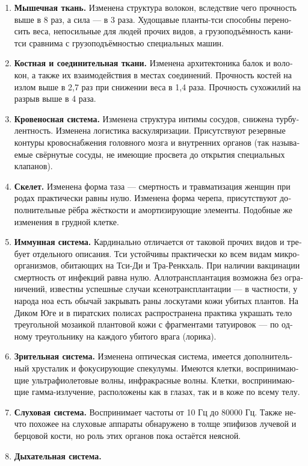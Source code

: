 \documentclass[a4paper,12pt,fleqn]{book}\usepackage{cooltooltips}\usepackage{polyglossia}\setdefaultlanguage[babelshorthands=true]{russian}\setotherlanguage{english}\defaultfontfeatures{Ligatures=TeX,Mapping=tex-text} \usepackage{xcolor}\definecolor{lightgray}{HTML}{bbbbbb}\color{lightgray}\newcommand{\ml}[3]{\textenglish{\textcolor{black}{#3}}}
\begin{document}
\begin{enumerate}
\item \textbf{Мышечная ткань.}
Изменена структура волокон, вследствие чего прочность выше в 8 раз, а сила --- в 3 раза.
Худощавые планты-тси способны переносить веса, непосильные для людей прочих видов, а грузоподъёмность кани-тси сравнима с грузоподъёмностью специальных машин.
\item \textbf{Костная и соединительная ткани.}
Изменена архитектоника балок и волокон, а также их взаимодействия в местах соединений.
Прочность костей на излом выше в 2,7 раз при снижении веса в 1,4 раза.
Прочность сухожилий на разрыв выше в 4 раза.
\item \textbf{Кровеносная система.}
Изменена структура интимы сосудов, снижена турбулентность.
Изменена логистика васкуляризации.
Присутствуют резервные контуры кровоснабжения головного мозга и внутренних органов (так называемые свёрнутые сосуды, не имеющие просвета до открытия специальных клапанов).
\item \textbf{Скелет.}
Изменена форма таза --- смертность и травматизация женщин при родах практически равны нулю.
Изменена форма черепа, присутствуют дополнительные рёбра жёсткости и амортизирующие элементы.
Подобные же изменения в грудной клетке.
\item \textbf{Иммунная система.}
Кардинально отличается от таковой прочих видов и требует отдельного описания.
Тси устойчивы практически ко всем видам микроорганизмов, обитающих на Тси-Ди и Тра-Ренкхаль.
При наличии вакцинации смертность от инфекций равна нулю.
Аллотрансплантация возможна без ограничений, известны успешные случаи ксенотрансплантации --- в частности, у народа ноа есть обычай закрывать раны лоскутами кожи убитых плантов.
На Диком Юге и в пиратских полисах распространена практика украшать тело треугольной мозаикой плантовой кожи с фрагментами татуировок --- по одному треугольнику на каждого убитого врага (лорика).
\item \textbf{Зрительная система.}
Изменена оптическая система, имеется дополнительный хрусталик и фокусирующие спекулумы.
Имеются клетки, воспринимающие ультрафиолетовые волны, инфракрасные волны.
Клетки, воспринимающие гамма-излучение, расположены как в глазах, так и в коже по всему телу.
\item \textbf{Слуховая система.}
Воспринимает частоты от 10 Гц до 80000 Гц.
Также нечто похожее на слуховые аппараты обнаружено в толще эпифизов лучевой и берцовой кости, но роль этих органов пока остаётся неясной.
\item \textbf{Дыхательная система.}

\end{enumerate}
\end{document}
